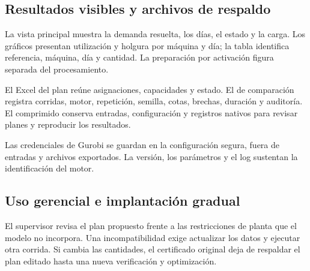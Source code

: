 \subsection{Resultados visibles y archivos de respaldo}
La vista principal muestra la demanda resuelta, los días, el estado y la carga. Los gráficos presentan utilización y holgura por máquina y día; la tabla identifica referencia, máquina, día y cantidad. La preparación por activación figura separada del procesamiento.

El Excel del plan reúne asignaciones, capacidades y estado. El de comparación registra corridas, motor, repetición, semilla, cotas, brechas, duración y auditoría. El comprimido conserva entradas, configuración y registros nativos para revisar planes y reproducir los resultados.

Las credenciales de Gurobi se guardan en la configuración segura, fuera de entradas y archivos exportados. La versión, los parámetros y el log sustentan la identificación del motor.

\subsection{Uso gerencial e implantación gradual}
El supervisor revisa el plan propuesto frente a las restricciones de planta que el modelo no incorpora. Una incompatibilidad exige actualizar los datos y ejecutar otra corrida. Si cambia las cantidades, el certificado original deja de respaldar el plan editado hasta una nueva verificación y optimización.
